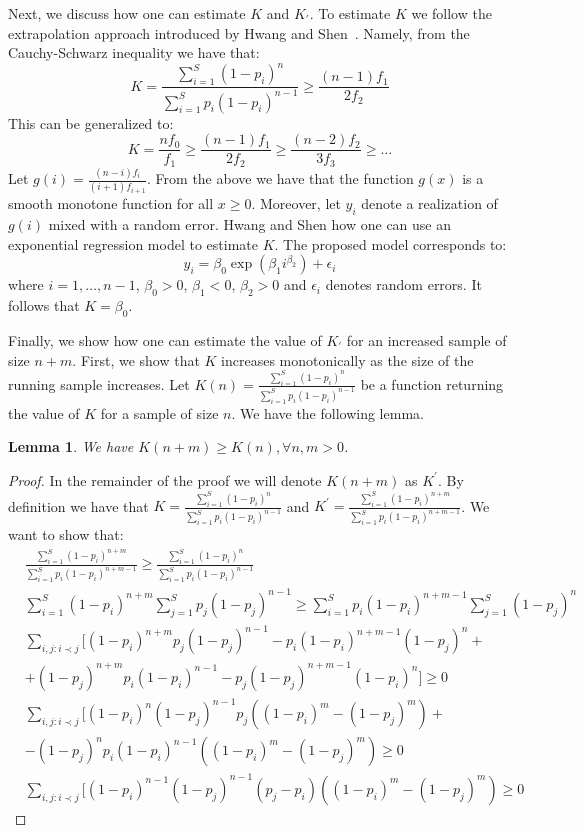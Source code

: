 \documentclass{vldb}
\newtheorem{lemma}{Lemma}
\begin{document}
\begin{appendix}
Next, we discuss how one can estimate $K$ and $K_{\prime}$. To estimate $K$ we follow the extrapolation approach introduced by Hwang and Shen~\cite{hwang:2010}. Namely, from the Cauchy-Schwarz inequality we have that:
\begin{equation}
K = \frac{\sum_{i=1}^S (1-p_i)^n}{\sum_{i=1}^S p_i(1-p_i)^{n-1}} \geq \frac{(n-1)f_1}{2f_2}
\end{equation}
This can be generalized to:
\begin{equation}
K=\frac{nf_0}{f_1} \geq \frac{(n-1)f_1}{2f_2} \geq \frac{(n-2)f_2}{3f_3} \geq \dots
\end{equation}
Let $g(i) = \frac{(n-i)f_i}{(i+1)f_{i+1}}$. From the above we have that the function $g(x)$ is a smooth monotone function for all $x \geq 0$. Moreover, let $y_i$ denote a realization of $g(i)$ mixed with a random error. Hwang and Shen how one can use an exponential regression model to estimate $K$. The proposed model corresponds to:
\begin{equation}
y_i = \beta_0\exp(\beta_1i^{\beta_2}) + \epsilon_i
\end{equation}
where $i = 1, \dots, n-1$, $\beta_0 > 0$, $\beta_1 < 0$, $\beta_2 >0$ and $\epsilon_i$ denotes random errors. It follows that $K = \beta_0$. 

Finally, we show how one can estimate the value of $K_\prime$ for an increased sample of size $n+m$. First, we show that $K$ increases monotonically as the size of the running sample increases. Let $K(n) = \frac{\sum_{i=1}^S (1-p_i)^n}{\sum_{i=1}^S p_i(1-p_i)^{n-1}}$ be a function returning the value of $K$ for a sample of size $n$. We have the following lemma. 

\begin{lemma}
We have $K(n+m) \geq K(n), \forall n,m > 0$.
\end{lemma}
\begin{proof}
In the remainder of the proof we will denote $K(n+m)$ as $K^{\prime}$. By definition we have that $K = \frac{\sum_{i=1}^S (1-p_i)^n}{\sum_{i=1}^S p_i(1-p_i)^{n-1}}$ and $K^{\prime} = \frac{\sum_{i=1}^S (1-p_i)^{n+m}}{\sum_{i=1}^S p_i(1-p_i)^{n+m-1}}$. We want to show that:
{\small
\begin{align}
&\frac{\sum_{i=1}^S (1-p_i)^{n+m}}{\sum_{i=1}^S p_i(1-p_i)^{n+m-1}} \geq \frac{\sum_{i=1}^S (1-p_i)^n}{\sum_{i=1}^S p_i(1-p_i)^{n-1}} \nonumber \\
&\sum_{i=1}^S (1-p_i)^{n+m}\sum_{j=1}^S p_j(1-p_j)^{n-1} \geq \sum_{i=1}^S p_i(1-p_i)^{n+m-1}\sum_{j=1}^S (1-p_j)^n\nonumber \\
&\sum_{i,j:i\prec j}[(1-p_i)^{n+m}p_j(1-p_j)^{n-1} - p_i(1-p_i)^{n+m-1}(1-p_j)^n + \nonumber \\
& + (1-p_j)^{n+m}p_i(1-p_i)^{n-1} - p_j(1-p_j)^{n+m-1}(1-p_i)^n] \geq 0 \nonumber \\
&\sum_{i,j:i\prec j}[(1-p_i)^{n}(1-p_j)^{n-1}p_j((1-p_i)^{m} - (1-p_j)^{m})  + \nonumber \\
& - (1-p_j)^{n}p_i(1-p_i)^{n-1}((1-p_i)^{m} - (1-p_j)^{m}) \geq 0 \nonumber \\
&\sum_{i,j:i\prec j}[(1-p_i)^{n-1}(1-p_j)^{n-1}(p_j-p_i)((1-p_i)^{m} - (1-p_j)^{m}) \geq 0
\end{align}}


\end{proof}
\end{appendix}
\end{document}
